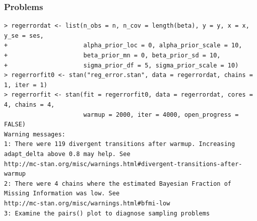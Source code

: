 \documentclass[xcolor=dvipsnames]{beamer}
\begin{document}
\begin{frame}[fragile]
\frametitle{Problems}
{\tiny
\begin{verbatim}
> regerrordat <- list(n_obs = n, n_cov = length(beta), y = y, x = x, y_se = ses,
+                     alpha_prior_loc = 0, alpha_prior_scale = 10,
+                     beta_prior_mn = 0, beta_prior_sd = 10,
+                     sigma_prior_df = 5, sigma_prior_scale = 10)
> regerrorfit0 <- stan("reg_error.stan", data = regerrordat, chains = 1, iter = 1)
> regerrorfit <- stan(fit = regerrorfit0, data = regerrordat, cores = 4, chains = 4,
                      warmup = 2000, iter = 4000, open_progress = FALSE)
Warning messages:
1: There were 119 divergent transitions after warmup. Increasing adapt_delta above 0.8 may help. See
http://mc-stan.org/misc/warnings.html#divergent-transitions-after-warmup
2: There were 4 chains where the estimated Bayesian Fraction of Missing Information was low. See
http://mc-stan.org/misc/warnings.html#bfmi-low
3: Examine the pairs() plot to diagnose sampling problems
\end{verbatim}}

\end{frame}

\end{document}
